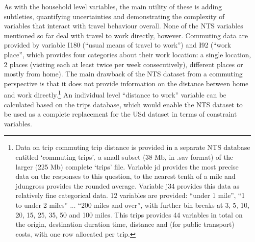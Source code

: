 \documentclass[a4paper, 11pt, twoside]{Thesis}
\begin{document}
As with the household level variables, the main utility of these is adding
subtleties, quantifying uncertainties and demonstrating the complexity of
variables that interact with travel behaviour overall. None of the NTS variables
mentioned so far deal with travel to work directly, however. Commuting data are
provided by variable I180 (``usual means of travel to work'') and I92 (``work
place'', which provides four categories about their work location: a single
location, 2 places (visiting each at least twice per week consecutively),
different places or mostly from home). The main drawback of the NTS dataset
from a commuting perspective is that it does not provide information on the
distance between home and
work directly.\footnote{Data
on trip commuting trip distance is
provided in a separate NTS database entitled `commuting-trips', a small subset
(38 Mb, in .sav format) of the larger (225 Mb) complete `trips' file. Variable
jd provides the most precise data on the responses to this question, to the
nearest tenth of a mile and jdungross provides the rounded average.
Variable j34 provides this data as relatively fine categorical data. 12
variables are provided: ``under 1 mile'', ``1 to under 2 miles'' ... ``200 miles
and over'', with further bin breaks at 3, 5, 10, 20, 15, 25, 35, 50 and 100
miles. This trips provides 44 variables in total on the origin, destination
duration time, distance and (for public transport) costs, with one row allocated
per trip. } 
An individual level ``distance to work'' variable can be calculated based on
the
trips database, which would enable the NTS dataset to be used as a complete
replacement for the USd dataset in terms of constraint variables.
\end{document}
